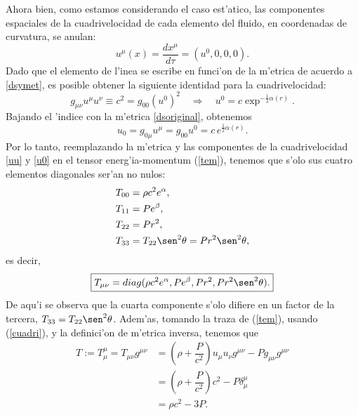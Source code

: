 Ahora bien, como estamos considerando el caso est'atico, las componentes espaciales de la cuadrivelocidad de cada elemento del fluido, en coordenadas de curvatura, se anulan:
\begin{equation}\label{uu}
 u^{\mu}(x)=\frac{dx^{\mu}}{d\tau}=(u^0,0,0,0).
\end{equation}
Dado que el elemento de l'inea se escribe en funci'on de la m'etrica de acuerdo a \eqref{dsymet}, es posible obtener la siguiente identidad para la cuadrivelocidad:
\begin{equation}\label{cuadri}
g_{\mu\nu}u^{\mu}u^{\nu}\equiv c^2=g_{00}(u^0)^2\quad\Rightarrow\quad u^{0}=c\exp^{-\frac{1}{2}\alpha(r)}.
\end{equation}
Bajando el 'indice con la m'etrica \eqref{dsoriginal}, obtenemos
\begin{equation}\label{u0}
 u_0=g_{0\mu}u^{\mu}=g_{00}u^{0}=c\,e^{\frac{1}{2}\alpha(r)}.
\end{equation}
Por lo tanto, reemplazando la m'etrica y las componentes de la cuadrivelocidad  \eqref{uu} y \eqref{u0} en el tensor energ'ia-momentum (\ref{tem}), tenemos que s'olo sus cuatro elementos diagonales ser'an no nulos:
\begin{align}
T_{00}&=\rho c^2 e^{\alpha},\nonumber\\
T_{11}&=P e^{\beta},\nonumber\\
T_{22}&=P r^2,\label{tem2}\\
T_{33}&=T_{22}\sen^2\theta=P r^2\sen^2\theta,\nonumber
\end{align}
es decir,
\begin{equation}\label{tem3}
 \boxed{T_{\mu\nu}=diag(\rho c^2 e^{\alpha},P e^{\beta},P r^2,P r^2\sen^2\theta).}
\end{equation}
De aqu'i se observa que la cuarta componente s'olo difiere en un factor de la tercera, $T_{33}=T_{22}\sen^2\theta$. Adem'as, tomando la traza de (\ref{tem}), usando (\ref{cuadri}), y la definici'on de m'etrica inversa, tenemos que
\begin{align}\label{traza}
T:=T^{\mu}_{\mu}=T_{\mu\nu}g^{\mu\nu}&=\left(\rho+\dfrac{P}{c^2}\right)u_{\mu}u_{\nu}g^{\mu\nu}-Pg_{\mu\nu}g^{\mu\nu}\\
&=\left(\rho+\dfrac{P}{c^2}\right)c^2-P\delta_{\mu}^{\mu}\\
&=\rho c^2-3P.
\end{align}

